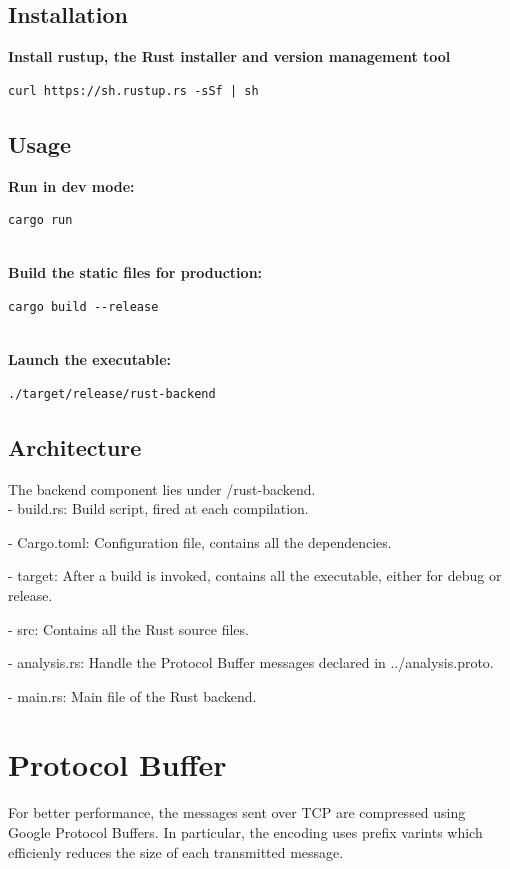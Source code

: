 \documentclass[12pt,hidelinks]{article}
\begin{document}
\subsection{Installation} 

\textbf{Install rustup, the Rust installer and version management tool}
\begin{verbatim}
curl https://sh.rustup.rs -sSf | sh
\end{verbatim}

\subsection{Usage} 

\textbf{Run in dev mode:}
\begin{verbatim}
cargo run
\end{verbatim}
\\
\textbf{Build the static files for production:}
\begin{verbatim}
cargo build --release
\end{verbatim}
\\
\textbf{Launch the executable:}
\begin{verbatim}
./target/release/rust-backend
\end{verbatim}

\subsection{Architecture}
The backend component lies under /rust-backend. \\

- build.rs:
Build script, fired at each compilation.

- Cargo.toml:
Configuration file, contains all the dependencies.

- target: 
After a build is invoked, contains all the executable, either for debug or release.

- src:
Contains all the Rust source files.

	\hspace*{10mm}- analysis.rs:
	Handle the Protocol Buffer messages declared in ../analysis.proto.

	\hspace*{10mm}- main.rs:
	Main file of the Rust backend.

\section{Protocol Buffer}
For better performance, the messages sent over TCP are compressed using Google Protocol Buffers. In particular, the encoding uses prefix varints which efficienly reduces the size of each transmitted message. 
\end{document}
